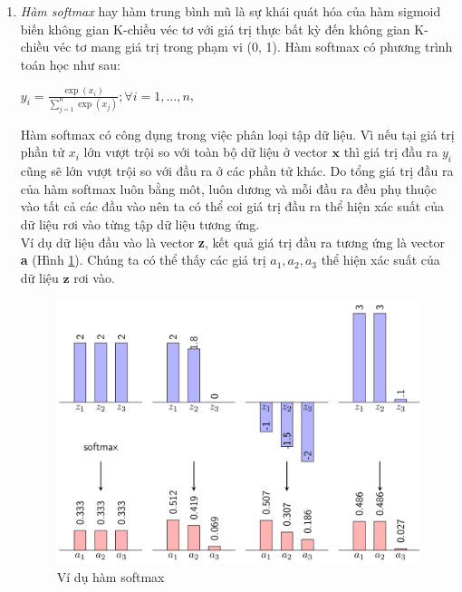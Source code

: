 \begin{enumerate}
\begin{center}
	$f'(x) =
    \begin{cases}
       0,$ if $x < 0,\\
       1,  otherwise.
    \end{cases}
    $
\end{center}
	  Hàm ReLU thường được sử dụng làm hàm truyền trong các hidden layer, còn ở layer cuối cùng thì ta sẽ sử dụng hàm khác để có thể tính toán được sắc xuất dự đoán vào vùng phân loại.	
\item
\label{sec:softmax}
\textit{Hàm softmax} hay hàm trung bình mũ \cite{mlcb}  là sự khái quát hóa của hàm sigmoid biến không gian K-chiều véc tơ  với giá trị thực bất kỳ đến không gian K-chiều véc tơ  mang giá trị trong phạm vi (0, 1).
Hàm softmax có phương trình toán học như sau:
\begin{center}
	$y_i=\frac{\exp({x_i})}{\sum^{n}_{j=1}{\exp({x_j})}}; \forall i=1,...,n$, 
\end{center}	
Hàm softmax có công dụng trong việc phân loại tập dữ liệu. Vì nếu tại giá trị phần tử $x_i$ lớn vượt trội so với toàn bộ dữ liệu ở vector $\textbf{x}$ thì giá trị đầu ra $y_i$ cũng sẽ lớn vượt trội so với đầu ra ở các phần tử khác. Do tổng giá trị đầu ra của hàm softmax luôn bằng môt, luôn dương và mỗi đầu ra đều phụ thuộc vào tất cả các đầu vào nên ta có thể coi giá trị đầu ra thể hiện xác suất của dữ liệu rơi vào từng tập dữ liệu tương ứng.\\
Ví dụ dữ liệu đầu vào là vector \textbf{z}, kết quả giá trị đầu ra tương ứng là vector \textbf{a} (Hình \ref{fig:vdsoftmax}). Chúng ta có thể thấy các giá trị $a_1,a_2,a_3$ thể hiện xác suất của dữ liệu $\textbf{z}$ rơi vào.
\begin{center}
	\begin{figure}[H]
	\begin{center}
		\includegraphics[scale=0.1]{chap3/image/softmax_ex.png}
	\end{center}			
	\caption[]{Ví dụ hàm softmax \protect\footnotemark}
	\label{fig:vdsoftmax}
	\end{figure}
\end{center}
\end{enumerate}
